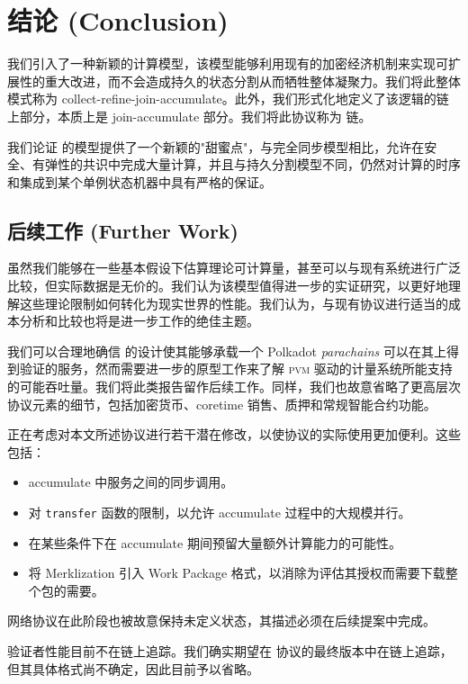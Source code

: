 \section{结论 (Conclusion)}
\label{sec:conclusion}

我们引入了一种新颖的计算模型，该模型能够利用现有的加密经济机制来实现可扩展性的重大改进，而不会造成持久的状态分割从而牺牲整体凝聚力。我们将此整体模式称为 collect-refine-join-accumulate。此外，我们形式化地定义了该逻辑的链上部分，本质上是 join-accumulate 部分。我们将此协议称为 \Jam 链。

我们论证 \Jam 的模型提供了一个新颖的"甜蜜点"，与完全同步模型相比，允许在安全、有弹性的共识中完成大量计算，并且与持久分割模型不同，仍然对计算的时序和集成到某个单例状态机器中具有严格的保证。

\subsection{后续工作 (Further Work)}

虽然我们能够在一些基本假设下估算理论可计算量，甚至可以与现有系统进行广泛比较，但实际数据是无价的。我们认为该模型值得进一步的实证研究，以更好地理解这些理论限制如何转化为现实世界的性能。我们认为，与现有协议进行适当的成本分析和比较也将是进一步工作的绝佳主题。

我们可以合理地确信 \Jam 的设计使其能够承载一个 Polkadot \emph{parachains} 可以在其上得到验证的服务，然而需要进一步的原型工作来了解 \textsc{pvm} 驱动的计量系统所能支持的可能吞吐量。我们将此类报告留作后续工作。同样，我们也故意省略了更高层次协议元素的细节，包括加密货币、coretime 销售、质押和常规智能合约功能。

正在考虑对本文所述协议进行若干潜在修改，以使协议的实际使用更加便利。这些包括：

\begin{itemize}
  \item accumulate 中服务之间的同步调用。
  \item 对 \texttt{transfer} 函数的限制，以允许 accumulate 过程中的大规模并行。
  \item 在某些条件下在 accumulate 期间预留大量额外计算能力的可能性。
  \item 将 Merklization 引入 Work Package 格式，以消除为评估其授权而需要下载整个包的需要。
\end{itemize}

网络协议在此阶段也被故意保持未定义状态，其描述必须在后续提案中完成。

验证者性能目前不在链上追踪。我们确实期望在 \Jam 协议的最终版本中在链上追踪，但其具体格式尚不确定，因此目前予以省略。
